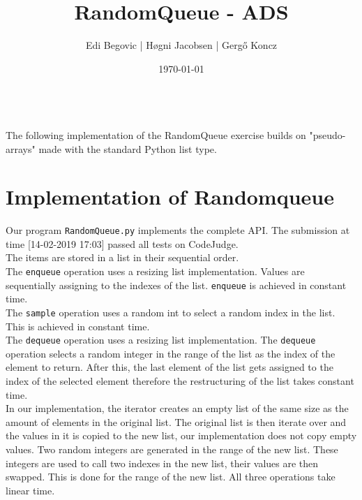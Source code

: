 \documentclass[a4paper]{article}
\title{RandomQueue - ADS}
\author{Edi Begovic | Høgni Jacobsen | Gergő Koncz}
\date{\today}
\begin{document}
 
\maketitle

\ \\
\noindent
The following implementation of the RandomQueue exercise builds on "pseudo-arrays" made 
with the standard Python list type.
\ \\
\section*{Implementation of Randomqueue}

\noindent
Our program \texttt{RandomQueue.py} implements the complete API.
The submission at time [14-02-2019 17:03] passed all tests on CodeJudge. \\

The items are stored in a list in their sequential order. \\

The \texttt{enqueue}  operation uses  a resizing list implementation. Values are sequentially assigning to the indexes of the list.
\texttt{enqueue} is achieved in constant time. \\

The \texttt{sample} operation uses a random int to select a random index in the list. This is achieved in constant time.  \\

The \texttt{dequeue} operation uses  a resizing list implementation. The \texttt{dequeue} operation selects a random integer in the range of the list as the index of the element to return. After this, the last element of the list gets assigned to the index of the selected element therefore the restructuring of the list takes constant time. \\

In our implementation, the iterator creates an empty list of the same size as the amount of elements in the original list. The original list is then iterate over and the values in it is copied to the new list, our implementation does not copy empty values. Two random integers are generated in the range of the new list. These integers are used to call two indexes in the new list, their values are then swapped. This is done for the range of the new list. All three operations take linear time.  \\
\end{document}
